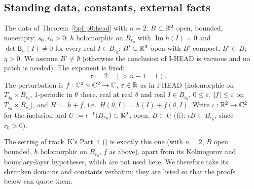 \subsection{Standing data, constants, external facts}\label{bpI:p3:sec-data}

\begin{assumption}\label{bpI:p3:setting}
The data of Theorem~\ref{bpI:p0:head} with $n=2$: $B\subset\mathbb{R}^2$ open, bounded, nonempty; $s_0,r_0>0$; $h$ holomorphic on $B_{r_0}$
with $\operatorname{Im}h(I)=0$ and $\det\mathsf B_h(I)\ne0$ for every real $I\in B_{r_0}$; $B'\subset\mathbb{R}^2$ open with
$\overline{B'}$ compact, $\overline{B'}\subset B$; $\eta>0$. We assume $B'\ne\emptyset$ (otherwise the conclusion of
I-HEAD is vacuous and no patch is needed). The exponent is fixed:
\[
\tau:=2\quad(>n-1=1).
\]
The perturbation is $f:\mathbb{C}^2\times\mathbb{C}^2\to\mathbb{C}$, $\varepsilon\in\mathbb{R}$ as in I-HEAD (holomorphic on $T_{s_0}\times B_{r_0}$, $1$-periodic in $\theta$ there,
real at real $\theta$ and real $I\in B_{r_0}$, $0\le\varepsilon$, $\lvert f\rvert\le\varepsilon$ on $T_{s_0}\times B_{r_0}$), and
$H:=h+f$, i.e.\ $H(\theta,I)=h(I)+f(\theta,I)$. Write $\iota:\mathbb{R}^2\to\mathbb{C}^2$ for the inclusion and $U:=\iota^{-1}(B_{r_0})\subset\mathbb{R}^2$,
open, $B\subset U$ ((i): $\iota B\subset B_{r_0}$, since $r_0>0$).
\end{assumption}

The setting of track~K's Part~4 () is exactly this one (with $n=2$, $B$ open bounded, $h$ holomorphic on
$B_{r_0}$, $f$ as above), apart from its Kolmogorov and boundary-layer hypotheses, which are not used here. We therefore take
its shrunken domains and constants verbatim; they are listed so that the proofs below can quote them.

